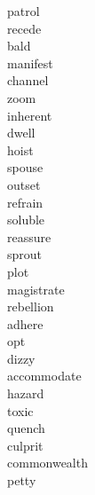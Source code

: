 \documentclass[a4paper, 11pt]{ctexart}
\begin{document}
\begin{multicols*}{3}
\begin{description}
\item[patrol]

\item[recede]

\item[bald]

\item[manifest]

\item[channel]

\item[zoom]

\item[inherent]

\item[dwell]

\item[hoist]

\item[spouse]

\item[outset]

\item[refrain]

\item[soluble]

\item[reassure]

\item[sprout]

\item[plot]

\item[magistrate]

\item[rebellion]

\item[adhere]

\item[opt]

\item[dizzy]

\item[accommodate]

\item[hazard]

\item[toxic]

\item[quench]

\item[culprit]

\item[commonwealth]

\item[petty]


\end{description}
\end{multicols*}
\end{document}
